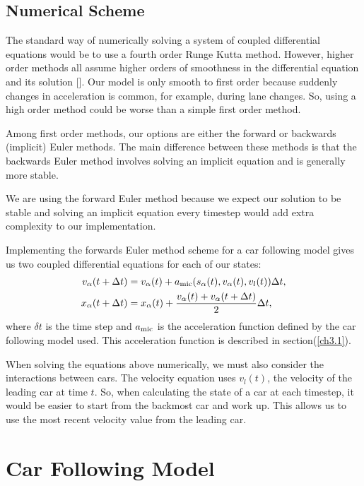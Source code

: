 \documentclass[12pt]{article}
\begin{document}
    \subsection{Numerical Scheme}
    The standard way of numerically solving a system of coupled differential equations would be to use a fourth order Runge Kutta method.
    However, higher order methods all assume higher orders of smoothness in the differential equation and its solution [\cite{numerics}].
    Our model is only smooth to first order because suddenly changes in acceleration is common, for example, during lane changes. 
    So, using a high order method could be worse than a simple first order method.

    Among first order methods, our options are either the forward or backwards (implicit) Euler methods. The main difference between these methods is that the backwards Euler method involves solving an implicit equation and is generally more stable.

    We are using the forward Euler method because we expect our solution to be stable and solving an implicit equation every timestep would add extra complexity to our implementation.

    Implementing the forwards Euler method scheme for a car following model gives us two coupled differential equations for each of our states:
    \begin{align}
        v_\alpha(t+\Delta t) &= v_\alpha(t) +a_{\rm mic}(s_\alpha(t), v_\alpha (t), v_l (t))\Delta t,\\
        x_\alpha(t + \Delta t) &= x_\alpha(t) + \frac{v_\alpha (t) + v_\alpha (t+\Delta t)}{2}\Delta t,
    \end{align}
    where $\delta t$ is the time step and $a_{\rm mic}$ is the acceleration function defined by the car following model used. This acceleration function is described in section(\ref{ch3.1}).

    When solving the equations above numerically, we must also consider the interactions between cars. The velocity equation uses $v_l(t)$, the velocity of the leading car at time $t$. So, when calculating the state of a car at each timestep, it would be easier to start from the backmost car and work up. This allows us to use the most recent velocity value from the leading car.     

    \section{Car Following Model}
\end{document}
